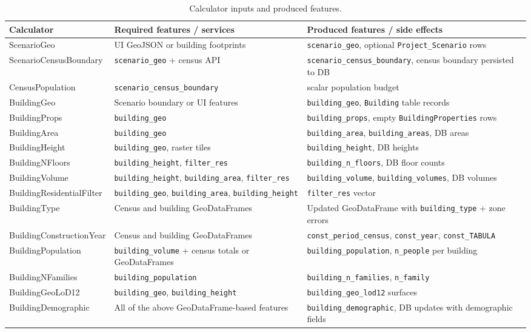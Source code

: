 \begin{table}[htbp]
    \centering
    \caption{Calculator inputs and produced features.}
    \label{tab:calc-dependencies}
    \begin{tabular}{p{3.6cm}p{5.2cm}p{5.8cm}}
        \toprule
        \textbf{Calculator} & \textbf{Required features / services} & \textbf{Produced features / side effects} \\
        \midrule
        ScenarioGeo & UI GeoJSON or building footprints & \texttt{scenario\_geo}, optional \texttt{Project\_Scenario} rows \\
        ScenarioCensusBoundary & \texttt{scenario\_geo} + census API & \texttt{scenario\_census\_boundary}, census boundary persisted to DB \\
        CensusPopulation & \texttt{scenario\_census\_boundary} & scalar population budget \\
        BuildingGeo & Scenario boundary or UI features & \texttt{building\_geo}, \texttt{Building} table records \\
        BuildingProps & \texttt{building\_geo} & \texttt{building\_props}, empty \texttt{BuildingProperties} rows \\
        BuildingArea & \texttt{building\_geo} & \texttt{building\_area}, \texttt{building\_areas}, DB areas \\
        BuildingHeight & \texttt{building\_geo}, raster tiles & \texttt{building\_height}, DB heights \\
        BuildingNFloors & \texttt{building\_height}, \texttt{filter\_res} & \texttt{building\_n\_floors}, DB floor counts \\
        BuildingVolume & \texttt{building\_height}, \texttt{building\_area}, \texttt{filter\_res} & \texttt{building\_volume}, \texttt{building\_volumes}, DB volumes \\
        BuildingResidentialFilter & \texttt{building\_geo}, \texttt{building\_area}, \texttt{building\_height} & \texttt{filter\_res} vector \\
        BuildingType & Census and building GeoDataFrames & Updated GeoDataFrame with \texttt{building\_type} + zone errors \\
        BuildingConstructionYear & Census and building GeoDataFrames & \texttt{const\_period\_census}, \texttt{const\_year}, \texttt{const\_TABULA} \\
        BuildingPopulation & \texttt{building\_volume} + census totals or GeoDataFrames & \texttt{building\_population}, \texttt{n\_people} per building \\
        BuildingNFamilies & \texttt{building\_population} & \texttt{building\_n\_families}, \texttt{n\_family} \\
        BuildingGeoLoD12 & \texttt{building\_geo}, \texttt{building\_height} & \texttt{building\_geo\_lod12} surfaces \\
        BuildingDemographic & All of the above GeoDataFrame-based features & \texttt{building\_demographic}, DB updates with demographic fields \\
        \bottomrule
    \end{tabular}
\end{table}


